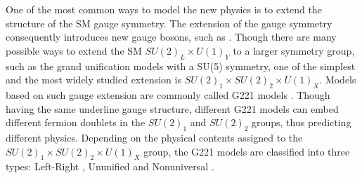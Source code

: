 One of the most common ways to model the new physics is to extend the structure of the SM gauge symmetry. The extension of the gauge symmetry consequently introduces new gauge bosons, such as \PWpr. Though there are many possible ways to extend the SM $SU(2)_L \times U(1)_Y $ to a larger symmetry group, such as the grand unification models with a SU(5) symmetry, one of the simplest and the most widely studied extension is $SU(2)_1 \times SU(2)_2 \times U(1)_X $. Models based on such gauge extension are commonly called G221 models \cite{Hsieh:2010zr}. Though having the same underline gauge structure, different G221 models can embed different fermion doublets in the $SU(2)_1$ and $SU(2)_2$ groups, thus predicting different physics. Depending on the physical contents assigned to the $SU(2)_1 \times SU(2)_2 \times U(1)_X $ group, the G221 models are classified into three types: Left-Right \cite{PhysRevD.11.2558}, Ununified \cite{Chivukula:1994qw, GEORGI1990541} and Nonuniversal \cite{PhysRevLett.47.1788, MULLER1997192, PhysRevD.81.015006}.





